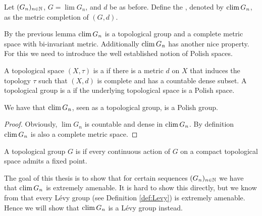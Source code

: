 \begin{definition}
	Let $(G_n)_{n\in\mathbb{N}}$, $G=\lim G_n$, and $d$ be as before. Define the , denoted by $\operatorname{clim} G_n$, as the metric completion of $(G,d)$.
\end{definition}
By the previous lemma $\operatorname{clim} G_n$ is a topological group and a complete metric space with bi-invariant metric. 
Additionally $\operatorname{clim} G_n$ has another nice property. For this we need to introduce the well established notion of Polish spaces. 
\begin{definition}
	A topological space $(X,\tau)$ is a  if there is a metric $d$ on $X$ that induces the topology $\tau$ such that $(X,d)$ is complete and has a countable dense subset. A topological group is a  if the underlying topological space is a Polish space.
\end{definition}
		
\begin{lemma}\label{lem:climIsPolish}
	We have that $\operatorname{clim} G_n$, seen as a topological group, is a Polish group.
\end{lemma}
\begin{proof}
	Obviously, $\lim G_n$ is countable and dense in $\operatorname{clim} G_n$. By definition $\operatorname{clim} G_n$ is also a complete metric space.
\end{proof}
		
\begin{definition}
	A topological group $G$ is  if every continuous action of $G$ on a compact topological space admits a fixed point.
\end{definition}
		
The goal of this thesis is to show that for certain sequences $(G_n)_{n\in\mathbb{N}}$ we have that $\operatorname{clim} G_n$ is extremely amenable. It is hard to show this directly, but we know from \cite{Levy} that every L\'evy group (see Definition \ref{def:Levy}) is extremely amenable. Hence we will show that $\operatorname{clim} G_n$ is a L\'evy group instead.
		
		
		
		
